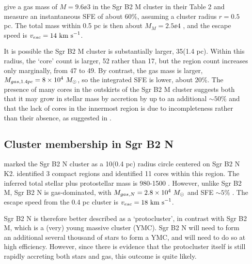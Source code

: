 \documentclass[twocolumn]{aastex61}
\begin{document}

\citet{Schmiedeke2016a} give a gas mass of $M=9.6\ee{3}$ \msun in the Sgr B2 M
cluster in their Table 2 and measure an instantaneous SFE of about 60\%, assuming
a cluster radius $r=0.5$ pc.  The total mass within 0.5 pc is then about $M_M =
2.5\ee{4}$ \msun, and the escape speed is $v_{esc}=14~\textrm{km~s}^{-1}$.



It is possible the Sgr B2 M cluster is substantially larger, 35\arcsec (1.4 pc).
Within this radius, the `core' count is larger, 52 rather than 17, but the \hii
region count increases only marginally, from 47 to 49.  By contrast,
the gas mass is larger, $M_{gas,1.4pc} = 8\times10^{4}~M_{\odot}$, so the integrated SFE is lower,
about 20\%.  
The presence of many cores in the outskirts of the Sgr B2 M cluster suggests
both that it may grow in stellar mass by accretion by up to an additional $\sim50\%$ and that
the lack of cores in the innermost region is due to incompleteness rather than
their absence, as suggested in \citet{Ginsburg2018a}.

\subsection{Cluster membership in Sgr B2 N}
\citet{Schmiedeke2016a} marked the Sgr B2 N cluster as a 10\arcsec  (0.4 pc) radius circle
centered on Sgr B2 N K2.  \citet{Schmiedeke2016a} identified 3 compact \hii regions
and \citet{Ginsburg2018a} identified 11 cores within this region.  The inferred
total stellar plus protostellar mass is 980-1500 \msun.  However, unlike Sgr B2
M, Sgr B2 N is gas-dominated, with $M_{gas,N} = 2.8\times10^{4}~M_{\odot}$ and SFE
$\sim5\%$ \citep{Schmiedeke2016a}.  The escape speed from the 0.4 pc cluster is
$v_{esc} = 18~\textrm{km~s}^{-1}$.

Sgr B2 N is therefore better described as a `protocluster', in contrast with
Sgr B2 M, which is a (very) young massive cluster (YMC).  Sgr B2 N will need to
form an additional several thousand \msun of stars to form a YMC, and will need
to do so at high efficiency.  However, since there is evidence that the
protocluster itself is still rapidly accreting both stars and gas, this outcome
is quite likely.
\end{document}
